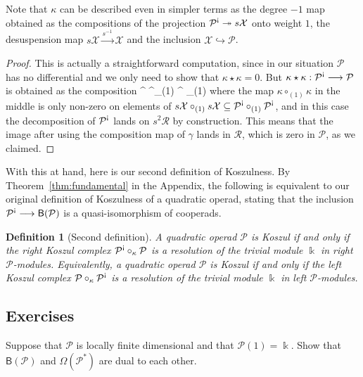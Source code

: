 \documentclass[fleqn, a4paper, twoside]{article}
\makeatletter
\newcommand{\antishriek}{\text{\raisebox{\depth}{\textexclamdown}}}
\newcommand{\0}{\langle 0\rangle}
\newcommand{\XX}{\mathcal{X}}
\newcommand{\RR}{\mathcal{R}}
\newcommand{\B}[1]{\mathsf{B}(#1)}
\let\[\@undefined
\DeclareRobustCommand{\[}{\begin{equation}}%
\let\]\@undefined
\DeclareRobustCommand{\]}{\end{equation}}%
\theoremstyle{mytheorem}
\theoremstyle{introthm}
\theoremstyle{mydefinition}
\newtheorem{definition}[theorem]{Definition}
\theoremstyle{mydefinition2}
\theoremstyle{plain} %
\newcommand{\?}{\,?\,}
\newcommand{\kk}{\Bbbk}
\newcommand{\PP}{{\mathcal{P}}}
\theoremstyle{mytheorem}
\theoremstyle{plain} %
\makeatother
\begin{document}
Note that $\kappa$ can be described even in simpler terms as
the degree $-1$ map obtained as the compositions of the projection
$\PP^\antishriek \twoheadrightarrow s\XX$ onto weight $1$,
the desuspension map $s\XX\stackrel{s^{-1}}\longrightarrow \XX$
and the inclusion $\XX \hookrightarrow \PP$. 

\begin{proof}
This is actually a straightforward computation,
since in our situation $\PP$ has no differential
and we only need to show that $\kappa\star \kappa = 0$. 
But $\kappa\star\kappa : \PP^\antishriek \longrightarrow \PP$
is obtained as the composition
\[
\PP^\antishriek{}\longrightarrow 
 	\PP^\antishriek \circ_{(1)} 	\PP^\antishriek 
 	 \longrightarrow
 	 	\PP \circ_{(1)} 	\PP 
 	 		\longrightarrow 
 	 		\PP
\]
where the map $\kappa\circ_{(1)} \kappa$ in the middle is only non-zero
on elements of $s\XX\circ_{(1)} s\XX \subseteq \PP^\antishriek\circ_{(1)} \PP^\antishriek$, and in this case the decomposition of $\PP^\antishriek$
lands on $s^2\mathcal R$ by construction. This means that
the image after using the composition map of $\gamma$ lands in $\RR$,
which is zero in $\PP$, as we claimed.
\end{proof}

With this at hand, here is our second definition of Koszulness.
By Theorem~\ref{thm:fundamental} in the Appendix, the following
is equivalent to our original definition of Koszulness of a quadratic
operad, stating that the inclusion $\PP^\antishriek \longrightarrow 
\B{\PP}$ is a quasi-isomorphism of cooperads. 

\begin{definition}[Second definition]
A quadratic operad $\PP$ is Koszul if and only if the
right Koszul complex $\PP^\antishriek \circ_\kappa \PP$
is a resolution of the trivial module $\kk$ in right
$\PP$-modules. Equivalently, 
a quadratic operad $\PP$ is Koszul if and only if the
left Koszul complex $\PP \circ_\kappa \PP^\antishriek$
is a resolution of the trivial module $\kk$ in left
$\PP$-modules.
\end{definition}

\subsection{Exercises}

\begin{question}
Suppose that $\PP$ is locally finite dimensional and that $\PP(1) = \kk$. 
Show that $\B{\PP}$ and $\Omega(\PP^*)$ are dual to each other.
\end{question}
\end{document}
